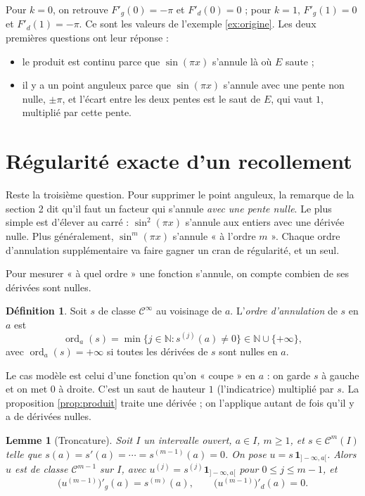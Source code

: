 \documentclass[11pt,a4paper]{article}
\theoremstyle{plain}
\newtheorem{lemme}[theoreme]{Lemme}
\theoremstyle{definition}
\newtheorem{definition}[theoreme]{Définition}
\theoremstyle{remark}
\newcommand{\N}{\mathbb{N}}
\newcommand{\Cc}{\mathcal{C}}
\newcommand{\1}{\mathbf{1}}
\DeclareMathOperator{\ord}{ord}
\begin{document}
Pour $k=0$, on retrouve $F'_g(0)=-\pi$ et $F'_d(0)=0$ ; pour $k=1$, $F'_g(1)=0$ et $F'_d(1)=-\pi$. Ce sont les valeurs de l'exemple \ref{ex:origine}. Les deux premières questions ont leur réponse :
\begin{itemize}[nosep]
\item le produit est continu parce que $\sin(\pi x)$ s'annule là où $E$ saute ;
\item il y a un point anguleux parce que $\sin(\pi x)$ s'annule avec une pente non nulle, $\pm\pi$, et l'écart entre les deux pentes est le saut de $E$, qui vaut $1$, multiplié par cette pente.
\end{itemize}

\section{Régularité exacte d'un recollement}

Reste la troisième question. Pour supprimer le point anguleux, la remarque de la section 2 dit qu'il faut un facteur qui s'annule \emph{avec une pente nulle}. Le plus simple est d'élever au carré : $\sin^2(\pi x)$ s'annule aux entiers avec une dérivée nulle. Plus généralement, $\sin^m(\pi x)$ s'annule « à l'ordre $m$ ». Chaque ordre d'annulation supplémentaire va faire gagner un cran de régularité, et un seul.

Pour mesurer « à quel ordre » une fonction s'annule, on compte combien de ses dérivées sont nulles.

\begin{definition}
Soit $s$ de classe $\Cc^\infty$ au voisinage de $a$. L'\emph{ordre d'annulation} de $s$ en $a$ est
\[
  \ord_a(s)=\min\{j\in\N : s^{(j)}(a)\neq0\}\in\N\cup\{+\infty\},
\]
avec $\ord_a(s)=+\infty$ si toutes les dérivées de $s$ sont nulles en $a$.
\end{definition}

Le cas modèle est celui d'une fonction qu'on « coupe » en $a$ : on garde $s$ à gauche et on met $0$ à droite. C'est un saut de hauteur $1$ (l'indicatrice) multiplié par $s$. La proposition \ref{prop:produit} traite une dérivée ; on l'applique autant de fois qu'il y a de dérivées nulles.

\begin{lemme}[Troncature]\label{lem:troncature}
Soit $I$ un intervalle ouvert, $a\in I$, $m\geq1$, et $s\in\Cc^m(I)$ telle que $s(a)=s'(a)=\cdots=s^{(m-1)}(a)=0$. On pose $u=s\,\1_{]-\infty,a[}$. Alors $u$ est de classe $\Cc^{m-1}$ sur $I$, avec $u^{(j)}=s^{(j)}\1_{]-\infty,a[}$ pour $0\leq j\leq m-1$, et
\[
  \big(u^{(m-1)}\big)'_g(a)=s^{(m)}(a), \qquad \big(u^{(m-1)}\big)'_d(a)=0 .
\]
\end{lemme}
\end{document}
